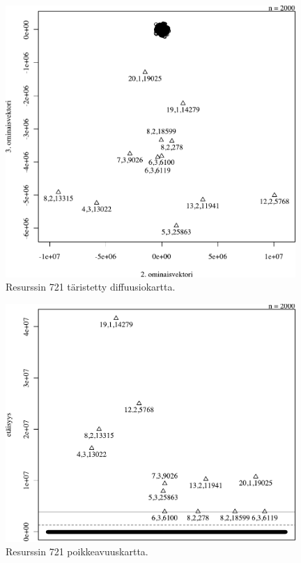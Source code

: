 \begin{figure}[p]
\centering
\includegraphics[width=11cm]{pics/diffuusiokuvat/service_721.pdf}
\caption{Resurssin 721 täristetty diffuusiokartta.}
\label{diffusio_721}
\end{figure}

\begin{figure}[p]
\centering
\includegraphics[width=11cm]{pics/tiheyskuvat/service_721.pdf}
\caption{Resurssin 721 poikkeavuuskartta.}
\label{service_721}
\end{figure}

